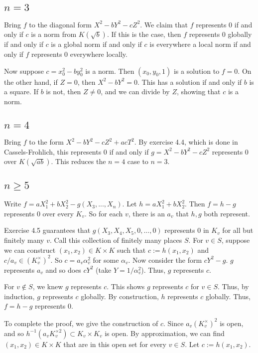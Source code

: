 \documentclass[12pt]{amsart}
\theoremstyle{named}
\begin{document}
\subsection{$n = 3$} Bring $f$ to the diagonal form $X^2 - bY^2 - cZ^2$. We
claim that $f$ represents 0 if and only if $c$ is a norm from $K(\sqrt{b})$.
If this is the case, then $f$ represents 0 globally if and only if $c$ is a
global norm if and only if $c$ is everywhere a local norm if and only if $f$
represents 0 everywhere locally.

Now suppose $c = x_0^2 - by_0^2$ is a norm. Then $(x_0, y_0, 1)$ is a solution
to $f = 0$. On the other hand, if $Z = 0$, then $X^2 - bY^2 = 0$. This has a
solution if and only if $b$ is a square. If $b$ is not, then $Z \neq 0$, and we
can divide by $Z$, showing that $c$ is a norm.

\subsection{$n = 4$} Bring $f$ to the form $X^2 - bY^2 - cZ^2 + acT^2$. By
exercise 4.4, which is done in Cassels-Frohlich, this represents 0 if and only
if $g = X^2 - bY^2 - cZ^2$ represents 0 over $K(\sqrt{ab})$. This reduces the
$n = 4$ case to $n = 3$.

\subsection{$n \geq 5$} Write $f = aX_1^2 + bX_2^2 - g(X_3, ..., X_n)$. Let
$h = aX_1^2 + bX_2^2$. Then $f = h - g$ represents 0 over every $K_v$. So for
each $v$, there is an $a_v$ that $h, g$ both represent.

Exercise 4.5 guarantees that $g(X_3, X_4, X_5, 0, ..., 0)$ represents 0 in $K_v$
for all but finitely many $v$. Call this collection of finitely many places
$S$. For $v \in S$, suppose we can construct $(x_1, x_2) \in K \times K$ such
that $c := h(x_1, x_2)$ and $c/a_v \in (K_v^\times)^2$. So $c = a_v \alpha_v^2$
for some $\alpha_v$. Now consider the form $cY^2 - g$. $g$ represents $a_v$ and
so does $cY^2$ (take $Y = 1/\alpha_v^2$). Thus, $g$ represents $c$. 

For $v \not\in S$, we knew $g$ represents $c$. This shows $g$ represents $c$ for
$v \in S$. Thus, by induction, $g$ represents $c$ globally. By construction,
$h$ represents $c$ globally. Thus, $f = h - g$ represents 0. 

To complete the proof, we give the construction of $c$. Since $a_v (K_v^\times)^2$ is
open, and so $h^{-1}(a_v K_v^{\times 2}) \subset K_v \times K_v$ is open. By
approximation, we can find $(x_1, x_2) \in K \times K$ that are in this open set
for every $v \in S$. Let $c := h(x_1, x_2)$.
\end{document}
